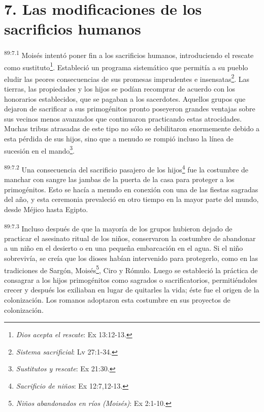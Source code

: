 \section*{7. Las modificaciones de los sacrificios humanos}
\par
\textsuperscript{89:7.1} Moisés intentó poner fin a los sacrificios humanos, introduciendo el rescate como sustituto\footnote{\textit{Dios acepta el rescate}: Ex 13:12-13.}. Estableció un programa sistemático que permitía a su pueblo eludir las peores consecuencias de sus promesas imprudentes e insensatas\footnote{\textit{Sistema sacrificial}: Lv 27:1-34.}. Las tierras, las propiedades y los hijos se podían recomprar de acuerdo con los honorarios establecidos, que se pagaban a los sacerdotes. Aquellos grupos que dejaron de sacrificar a sus primogénitos pronto poseyeron grandes ventajas sobre sus vecinos menos avanzados que continuaron practicando estas atrocidades. Muchas tribus atrasadas de este tipo no sólo se debilitaron enormemente debido a esta pérdida de sus hijos, sino que a menudo se rompió incluso la línea de sucesión en el mando\footnote{\textit{Sustitutos y rescate}: Ex 21:30.}.

\par
\textsuperscript{89:7.2} Una consecuencia del sacrificio pasajero de los hijos\footnote{\textit{Sacrificio de niños}: Ex 12:7,12-13.} fue la costumbre de manchar con sangre las jambas de la puerta de la casa para proteger a los primogénitos. Esto se hacía a menudo en conexión con una de las fiestas sagradas del año, y esta ceremonia prevaleció en otro tiempo en la mayor parte del mundo, desde Méjico hasta Egipto.

\par
\textsuperscript{89:7.3} Incluso después de que la mayoría de los grupos hubieron dejado de practicar el asesinato ritual de los niños, conservaron la costumbre de abandonar a un niño en el desierto o en una pequeña embarcación en el agua. Si el niño sobrevivía, se creía que los dioses habían intervenido para protegerlo, como en las tradiciones de Sargón, Moisés\footnote{\textit{Niños abandonados en ríos (Moisés)}: Ex 2:1-10.}, Ciro y Rómulo. Luego se estableció la práctica de consagrar a los hijos primogénitos como sagrados o sacrificatorios, permitiéndoles crecer y después los exiliaban en lugar de quitarles la vida; éste fue el origen de la colonización. Los romanos adoptaron esta costumbre en sus proyectos de colonización.

